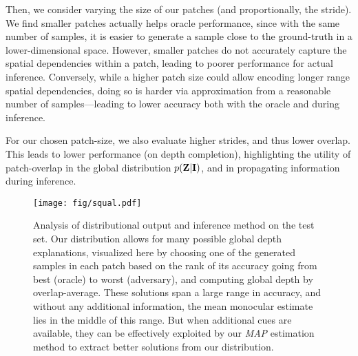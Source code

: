 \documentclass[10pt,twocolumn,letterpaper]{article}
\begin{document}
Then, we consider varying the size of our patches (and proportionally, the stride). We find smaller patches actually helps oracle performance, since with the same number of samples, it is easier to generate a sample close to the ground-truth in a lower-dimensional space. However, smaller patches do not accurately capture the spatial dependencies within a patch, leading to poorer performance for actual inference. Conversely, while a higher patch size could allow encoding longer range spatial dependencies, doing so is harder via approximation from a reasonable number of samples---leading to lower accuracy both with the oracle and during inference.

For our chosen patch-size, we also evaluate higher strides, and thus lower overlap. This leads to lower performance (on depth completion), highlighting the utility of patch-overlap in the global distribution $p(\mathbf{Z}|\mathbf{I})$, and in propagating information during inference.


\begin{figure}[!t]
  \centering
  \texttt{[image: fig/squal.pdf]}
  \caption{Analysis of distributional output and inference method on the test set. Our distribution allows for many possible global depth explanations, visualized here by choosing one of the generated samples in each patch based on the rank of its accuracy going from best (oracle) to worst (adversary), and computing global depth by overlap-average. These solutions span a large range in accuracy, and without any additional information, the mean monocular estimate lies in the middle of this range. But when additional cues are available, they can be effectively exploited by our \emph{MAP} estimation method to extract better solutions from our distribution.}
  \label{fig:squal}
\end{figure}
\end{document}
